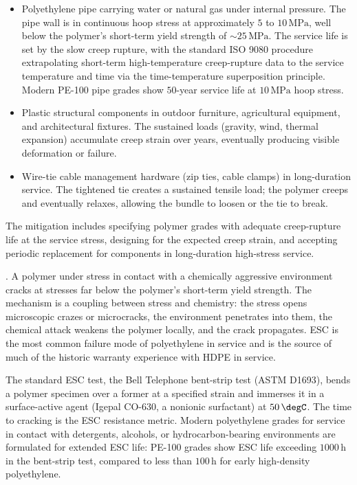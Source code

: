 \begin{itemize}[leftmargin=*]
\item Polyethylene pipe carrying water or natural gas under internal
  pressure. The pipe wall is in continuous hoop stress at
  approximately $5$ to $10\,\text{MPa}$, well below the polymer's
  short-term yield strength of $\sim 25\,\text{MPa}$. The service
  life is set by the slow creep rupture, with the standard ISO 9080
  procedure extrapolating short-term high-temperature creep-rupture
  data to the service temperature and time via the time-temperature
  superposition principle. Modern PE-100 pipe grades show
  $50$-year service life at $10\,\text{MPa}$ hoop stress.
\item Plastic structural components in outdoor furniture, agricultural
  equipment, and architectural fixtures. The sustained loads
  (gravity, wind, thermal expansion) accumulate creep strain over
  years, eventually producing visible deformation or failure.
\item Wire-tie cable management hardware (zip ties, cable clamps) in
  long-duration service. The tightened tie creates a sustained
  tensile load; the polymer creeps and eventually relaxes, allowing
  the bundle to loosen or the tie to break.
\end{itemize}

The mitigation includes specifying polymer grades with adequate
creep-rupture life at the service stress, designing for the
expected creep strain, and accepting periodic replacement for
components in long-duration high-stress service.

. A polymer under stress
in contact with a chemically aggressive environment cracks at
stresses far below the polymer's short-term yield strength. The
mechanism is a coupling between stress and chemistry: the stress
opens microscopic crazes or microcracks, the environment penetrates
into them, the chemical attack weakens the polymer locally, and the
crack propagates. ESC is the most common failure mode of
polyethylene in service and is the source of much of the historic
warranty experience with HDPE in service.

The standard ESC test, the Bell Telephone bent-strip test (ASTM
D1693), bends a polymer specimen over a former at a specified
strain and immerses it in a surface-active agent (Igepal CO-630, a
nonionic surfactant) at $50\,\degC$. The time to cracking is the
ESC resistance metric. Modern polyethylene grades for service in
contact with detergents, alcohols, or hydrocarbon-bearing
environments are formulated for extended ESC life: PE-100 grades show
ESC life exceeding $1000\,\text{h}$ in the bent-strip test, compared
to less than $100\,\text{h}$ for early high-density polyethylene.

